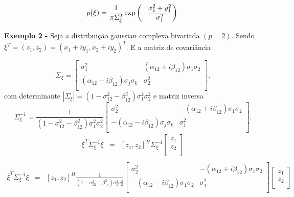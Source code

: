 \begin{equation}\label{eqn71}
	p(\xi)=\frac{1}{\pi\Sigma_{\xi}^{2}}\exp\left(-\frac{x_1^2+y_1^2}{\sigma_1^2}\right)  \\
\end{equation}

{\bf Exemplo 2 -} Seja a distribuição gaussian complexa bivariada $(p=2)$. Sendo $\xi^{T}=(z_1, z_2)=(x_1 + iy_1, x_2 + iy_2)^{T}$. E a matriz de covariância 

$$
\Sigma_{\xi} = \left[
\begin{array}{cc}
	\sigma_1^2                                &  (\alpha_{12}+i\beta_{12})\sigma_1\sigma_2  \\
	(\alpha_{12}-i\beta_{12})\sigma_j\sigma_k & \sigma_2^2 \\
\end{array}
\right].
$$
com determinante $|\Sigma_{\xi}|=(1 - \sigma_{12}^{2}- \beta_{12}^2)\sigma_{1}^2\sigma_{2}^2$ e  matriz inversa 
$$
\Sigma_{\xi}^{-1} =\frac{1}{(1 - \sigma_{12}^{2}- \beta_{12}^2)\sigma_{1}^2\sigma_{2}^2} \left[
\begin{array}{cc}
	\sigma_2^2                                &  -(\alpha_{12}+i\beta_{12})\sigma_1\sigma_2  \\
	-(\alpha_{12}-i\beta_{12})\sigma_j\sigma_k & \sigma_1^2 \\
\end{array}
\right].
$$
\begin{equation}\label{eqn72}
\begin{array}{ccc}
	\bar{\xi}^{T}\Sigma_{\xi}^{-1}\xi&=&[z_1,z_2]^{H}\Sigma_{\xi}^{-1}
	\left[
\begin{array}{c}
	z_1  \\
	z_2 \\
\end{array}\right]\\
\end{array}
\end{equation}
\begin{equation}\label{eqn73}
\begin{array}{ccc}
	\bar{\xi}^{T}\Sigma_{\xi}^{-1}\xi&=&[z_1,z_2]^{H}\frac{1}{(1 - \sigma_{12}^{2}- \beta_{12}^2)\sigma_{1}^2\sigma_{2}^2} \left[
\begin{array}{cc}
	\sigma_2^2                                &  -(\alpha_{12}+i\beta_{12})\sigma_1\sigma_2  \\
	-(\alpha_{12}-i\beta_{12})\sigma_1\sigma_2 & \sigma_1^2 \\
\end{array}
\right]
	\left[
\begin{array}{c}
	z_1  \\
	z_2 \\
\end{array}\right]\\
\end{array}
\end{equation}

